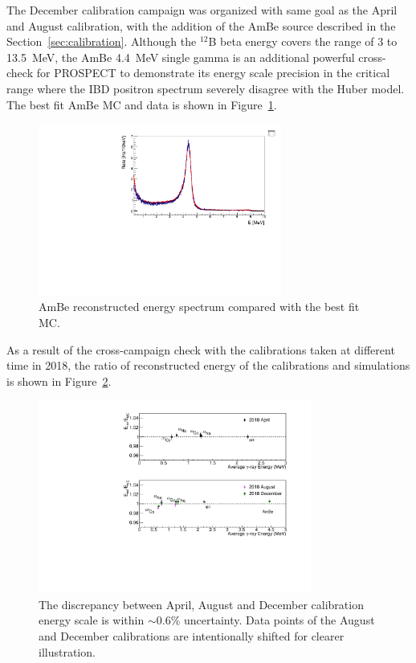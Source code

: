 The December calibration campaign was organized with same goal as the April and August calibration, with the addition of the AmBe source described in the Section~\ref{sec:calibration}.
Although the $^{12}$B beta energy covers the range of 3 to 13.5~MeV, the AmBe 4.4~MeV single gamma is an additional powerful cross-check for PROSPECT to demonstrate its energy scale precision in the critical range where the IBD positron spectrum severely disagree with the Huber model.
The best fit AmBe MC and data is shown in Figure~\ref{fig:AmBeCompare}.

\begin{figure}[h!]
\centering
\includegraphics[width=80mm]{Figures/hAmBev2.pdf}
\caption[AmBe data to MC comparison]{AmBe reconstructed energy spectrum compared with the best fit MC.}
\label{fig:AmBeCompare}
\end{figure}
 
As a result of the cross-campaign check with the calibrations taken at different time in 2018, the ratio of reconstructed energy of the calibrations  and simulations is shown in Figure~\ref{fig:compare}.

\begin{figure}[h!]
\centering
\includegraphics[width=0.8\textwidth]{Figures/PRDEscale3.pdf}
\caption[Discrepancies among calibration campaigns]{The discrepancy between April, August and December calibration energy scale is within $\sim0.6\%$ uncertainty.
	Data points of the August and December calibrations are intentionally shifted for clearer illustration.}
\label{fig:compare}
\end{figure}

